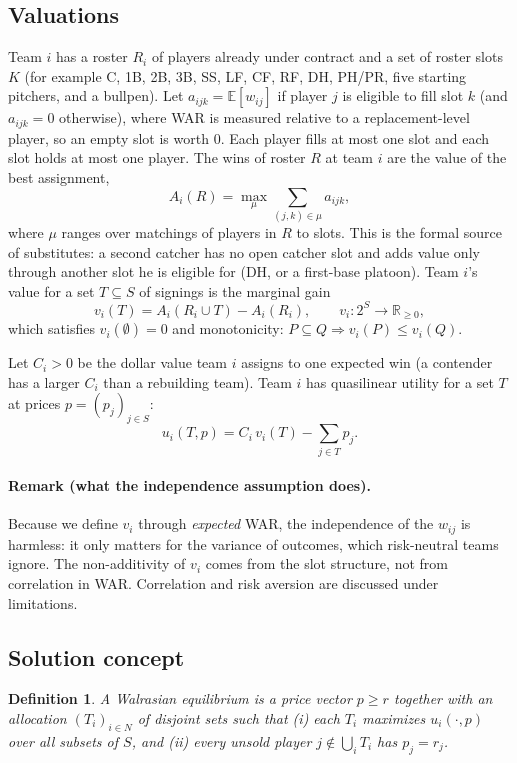 \documentclass{article}
\newtheorem{definition}{Definition}
\begin{document}
\subsection{Valuations}
Team $i$ has a roster $R_i$ of players already under contract and a set of roster slots $K$ (for example C, 1B, 2B, 3B, SS, LF, CF, RF, DH, PH/PR, five starting pitchers, and a bullpen). Let $a_{ijk} = \mathbb{E}[w_{ij}]$ if player $j$ is eligible to fill slot $k$ (and $a_{ijk} = 0$ otherwise), where WAR is measured relative to a replacement-level player, so an empty slot is worth $0$. Each player fills at most one slot and each slot holds at most one player. The wins of roster $R$ at team $i$ are the value of the best assignment,
\[
A_i(R) = \max_{\mu} \sum_{(j,k)\in\mu} a_{ijk},
\]
where $\mu$ ranges over matchings of players in $R$ to slots. This is the formal source of substitutes: a second catcher has no open catcher slot and adds value only through another slot he is eligible for (DH, or a first-base platoon). Team $i$'s value for a set $T \subseteq S$ of signings is the marginal gain
\[
v_i(T) = A_i(R_i \cup T) - A_i(R_i), \qquad v_i : 2^S \to \mathbb{R}_{\ge 0},
\]
which satisfies $v_i(\emptyset) = 0$ and monotonicity: $P \subseteq Q \Rightarrow v_i(P) \le v_i(Q)$.

Let $C_i > 0$ be the dollar value team $i$ assigns to one expected win (a contender has a larger $C_i$ than a rebuilding team). Team $i$ has quasilinear utility for a set $T$ at prices $p = (p_j)_{j\in S}$:
\[
u_i(T,p) = C_i\, v_i(T) - \sum_{j\in T} p_j .
\]

\paragraph{Remark (what the independence assumption does).} Because we define $v_i$ through \emph{expected} WAR, the independence of the $w_{ij}$ is harmless: it only matters for the variance of outcomes, which risk-neutral teams ignore. The non-additivity of $v_i$ comes from the slot structure, not from correlation in WAR. Correlation and risk aversion are discussed under limitations.

\subsection{Solution concept}
\begin{definition}
A \emph{Walrasian equilibrium} is a price vector $p \ge r$ together with an allocation $(T_i)_{i\in N}$ of disjoint sets such that (i) each $T_i$ maximizes $u_i(\cdot, p)$ over all subsets of $S$, and (ii) every unsold player $j \notin \bigcup_i T_i$ has $p_j = r_j$.
\end{definition}
\end{document}
